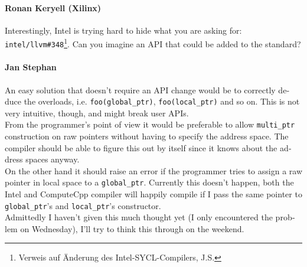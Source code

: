 \begin{otherlanguage}{english}
    \paragraph{Ronan Keryell (Xilinx)} Interestingly, Intel is trying hard to
                                       hide what you are asking for:\\
                                       \texttt{intel/llvm\#348}\footnote{Verweis
                                       auf Änderung des Intel-SYCL-Compilers, 
                                       J.S.}. Can you imagine an API that could
                                       be added to the standard?
    \paragraph{Jan Stephan} An easy solution that doesn't require an API change
                            would be to correctly deduce the overloads, i.e.
                            \texttt{foo(global\_ptr)}, \texttt{foo(local\_ptr)}
                            and so on. This is not very intuitive, though, and
                            might break user APIs.
                            \\
                            From the programmer's point of view it would be
                            preferable to allow \texttt{multi\_ptr}
                            construction on raw pointers without having to
                            specify the address space. The compiler should be
                            able to figure this out by itself since it knows
                            about the address spaces anyway.
                            \\
                            On the other hand it should raise an error if the
                            programmer tries to assign a raw pointer in local
                            space to a \texttt{global\_ptr}. Currently this
                            doesn't happen, both the Intel and ComputeCpp
                            compiler will happily compile if I pass the same
                            pointer to \texttt{global\_ptr}'s and
                            \texttt{local\_ptr}'s constructor.
                            \\
                            Admittedly I haven't given this much thought yet (I
                            only encountered the problem on Wednesday), I'll try
                            to think this through on the weekend.

\end{otherlanguage}
